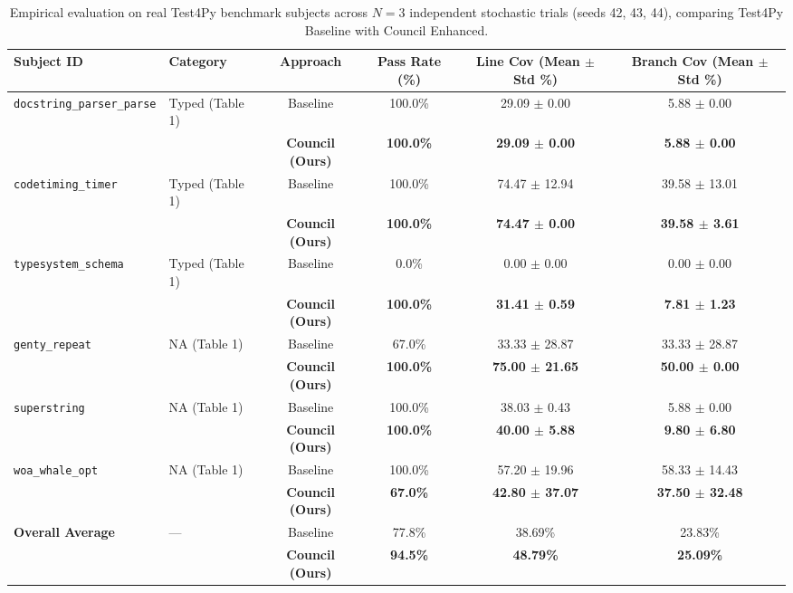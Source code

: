 \begin{table}[t]
\centering
\caption{Empirical evaluation on real Test4Py benchmark subjects across $N=3$ independent stochastic trials (seeds 42, 43, 44), comparing Test4Py Baseline with Council Enhanced.}
\label{tab:statistical_benchmark}
\small
\begin{tabular}{llcccc}
\toprule
\textbf{Subject ID} & \textbf{Category} & \textbf{Approach} & \textbf{Pass Rate (\%)} & \textbf{Line Cov (Mean $\pm$ Std \%)} & \textbf{Branch Cov (Mean $\pm$ Std \%)} \\
\midrule
\texttt{docstring\_parser\_parse} & Typed (Table 1) & Baseline & 100.0\% & 29.09 $\pm$ 0.00 & 5.88 $\pm$ 0.00 \\
 & & \textbf{Council (Ours)} & \textbf{100.0\%} & \textbf{29.09 $\pm$ 0.00} & \textbf{5.88 $\pm$ 0.00} \\
\midrule
\texttt{codetiming\_timer} & Typed (Table 1) & Baseline & 100.0\% & 74.47 $\pm$ 12.94 & 39.58 $\pm$ 13.01 \\
 & & \textbf{Council (Ours)} & \textbf{100.0\%} & \textbf{74.47 $\pm$ 0.00} & \textbf{39.58 $\pm$ 3.61} \\
\midrule
\texttt{typesystem\_schema} & Typed (Table 1) & Baseline & 0.0\% & 0.00 $\pm$ 0.00 & 0.00 $\pm$ 0.00 \\
 & & \textbf{Council (Ours)} & \textbf{100.0\%} & \textbf{31.41 $\pm$ 0.59} & \textbf{7.81 $\pm$ 1.23} \\
\midrule
\texttt{genty\_repeat} & NA (Table 1) & Baseline & 67.0\% & 33.33 $\pm$ 28.87 & 33.33 $\pm$ 28.87 \\
 & & \textbf{Council (Ours)} & \textbf{100.0\%} & \textbf{75.00 $\pm$ 21.65} & \textbf{50.00 $\pm$ 0.00} \\
\midrule
\texttt{superstring} & NA (Table 1) & Baseline & 100.0\% & 38.03 $\pm$ 0.43 & 5.88 $\pm$ 0.00 \\
 & & \textbf{Council (Ours)} & \textbf{100.0\%} & \textbf{40.00 $\pm$ 5.88} & \textbf{9.80 $\pm$ 6.80} \\
\midrule
\texttt{woa\_whale\_opt} & NA (Table 1) & Baseline & 100.0\% & 57.20 $\pm$ 19.96 & 58.33 $\pm$ 14.43 \\
 & & \textbf{Council (Ours)} & \textbf{67.0\%} & \textbf{42.80 $\pm$ 37.07} & \textbf{37.50 $\pm$ 32.48} \\
\midrule
\textbf{Overall Average} & --- & Baseline & 77.8\% & 38.69\% & 23.83\% \\
 & & \textbf{Council (Ours)} & \textbf{94.5\%} & \textbf{48.79\%} & \textbf{25.09\%} \\
\bottomrule
\end{tabular}
\end{table}
